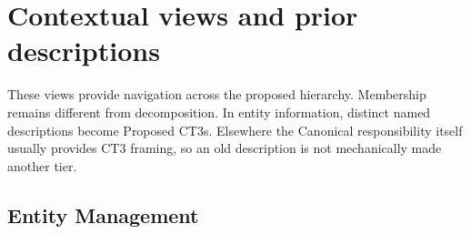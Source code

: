 \chapter{Contextual views and prior descriptions}\label{model:contexts}
These views provide navigation across the proposed hierarchy. Membership remains different from decomposition. In entity information, distinct named descriptions become Proposed CT3s. Elsewhere the Canonical responsibility itself usually provides CT3 framing, so an old description is not mechanically made another tier.

\section{Entity Management}
\begingroup\small\setlength{\TableWidth}{\dimexpr\linewidth-6\tabcolsep-4\arrayrulewidth\relax}
